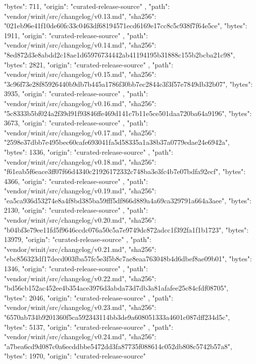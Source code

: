 {{      "bytes": 711,
      "origin": "curated-release-source"
    },
    {
      "path": "vendor/winit/src/changelog/v0.13.md",
      "sha256": "021eb96e41f10de60fc33c0463df68194571ecd6169e17cc8c5c938f7f64e5ce",
      "bytes": 1911,
      "origin": "curated-release-source"
    },
    {
      "path": "vendor/winit/src/changelog/v0.14.md",
      "sha256": "8ed872d3e8abdd2c18ae1d65976734442ab41194195b31888c155b2bcba21c98",
      "bytes": 2821,
      "origin": "curated-release-source"
    },
    {
      "path": "vendor/winit/src/changelog/v0.15.md",
      "sha256": "3c96f73e28f85926440b9db7b445a1786f30bb7ec2844c3f3f57e7849db32b07",
      "bytes": 3935,
      "origin": "curated-release-source"
    },
    {
      "path": "vendor/winit/src/changelog/v0.16.md",
      "sha256": "5c8333b5bf024a2f39d91f93846ffe469d141c7b11e5ce501daa720ba64a9196",
      "bytes": 3673,
      "origin": "curated-release-source"
    },
    {
      "path": "vendor/winit/src/changelog/v0.17.md",
      "sha256": "2598e37dbb7e495bec60cafe693041fa5d58335a1a38b37a0779edae24e6942a",
      "bytes": 1336,
      "origin": "curated-release-source"
    },
    {
      "path": "vendor/winit/src/changelog/v0.18.md",
      "sha256": "f61eab5f6eace3ff07f66d4340c21926172332c748ba3e3fc4b7e07bdfa92ecf",
      "bytes": 4366,
      "origin": "curated-release-source"
    },
    {
      "path": "vendor/winit/src/changelog/v0.19.md",
      "sha256": "ea5ca936d53274e8a4f8bd385ba59fff5df866d889a4a69ca329791a664a3aee",
      "bytes": 2130,
      "origin": "curated-release-source"
    },
    {
      "path": "vendor/winit/src/changelog/v0.20.md",
      "sha256": "b04bf3e79ee11fd5f9646ccdc076a50c5a7e9749dc872adcc1f392fa1f1b1723",
      "bytes": 13979,
      "origin": "curated-release-source"
    },
    {
      "path": "vendor/winit/src/changelog/v0.21.md",
      "sha256": "ebc856323df17decd003fba57fc5e3f5b8c7ae8eaa763048b4d6dbef8ae09b01",
      "bytes": 1346,
      "origin": "curated-release-source"
    },
    {
      "path": "vendor/winit/src/changelog/v0.22.md",
      "sha256": "bd56cb152ac452ee4b354ace3976d3abda73d7db3a81afafee25c84cfdf08705",
      "bytes": 2046,
      "origin": "curated-release-source"
    },
    {
      "path": "vendor/winit/src/changelog/v0.23.md",
      "sha256": "6570ab734b9201360f5ca592343114bb3de9a608051333a4601c087dff234d5c",
      "bytes": 5137,
      "origin": "curated-release-source"
    },
    {
      "path": "vendor/winit/src/changelog/v0.24.md",
      "sha256": "a7bea6cd9d087c0a6ecddbbe5472dd3fa87735f088614c052db808c5742b57a8",
      "bytes": 1970,
      "origin": "curated-release-source"
}}
